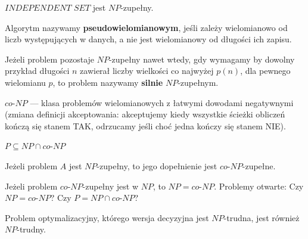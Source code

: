 \begin{twierdzenie}
    $INDEPENDENT$ $SET$ jest $NP$-zupełny.
\end{twierdzenie}

\begin{definicja}
    Algorytm nazywamy \textbf{pseudowielomianowym}, jeśli zależy wielomianowo od liczb występujących w danych, a nie jest wielomianowy od długości ich zapisu.
\end{definicja}

\begin{definicja}
    Jeżeli problem pozostaje $NP$-zupełny nawet wtedy, gdy wymagamy by dowolny przykład długości $n$ zawierał liczby wielkości co najwyżej $p(n)$, dla pewnego wielomianu $p$, to problem nazywamy \textbf{silnie} $NP$-zupełnym.
\end{definicja}

\begin{definicja}
    $co$-$NP$ --- klasa problemów wielomianowych z łatwymi dowodami negatywnymi (zmiana definicji akceptowania: akceptujemy kiedy wszystkie ścieżki obliczeń kończą się stanem TAK, odrzucamy jeśli choć jedna kończy się stanem NIE).
\end{definicja}

\begin{lemat}
    $P \subseteq NP \cap co$-$NP$
\end{lemat}

\begin{lemat}
    Jeżeli problem $A$ jest $NP$-zupełny, to jego dopełnienie jest $co$-$NP$-zupełne.
\end{lemat}

\begin{lemat}
    Jeżeli problem $co$-$NP$-zupełny jest w $NP$, to $NP = co$-$NP$. Problemy otwarte: Czy $NP = co$-$NP$? Czy $P = NP \cap co$-$NP$?
\end{lemat}

\begin{lemat}
    Problem optymalizacyjny, którego wersja decyzyjna jest $NP$-trudna, jest również $NP$-trudny.
\end{lemat}